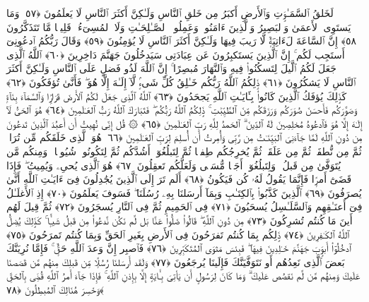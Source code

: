  لَخَلقُ ٱلسَّمَـٰوَٟتِ وَٱلأَرضِ أَكبَرُ مِن خَلقِ ٱلنَّاسِ وَلَـٰكِنَّ أَكثَرَ ٱلنَّاسِ لَا يَعلَمُونَ ﴿٥٧﴾
 وَمَا يَستَوِى ٱلأَعمَىٰ وَٱلبَصِيرُ وَٱلَّذِينَ ءَامَنُوا۟ وَعَمِلُوا۟ ٱلصَّـٰلِحَـٰتِ وَلَا ٱلمُسِىٓءُ ۚ قَلِيلًۭا مَّا تَتَذَكَّرُونَ ﴿٥٨﴾
 إِنَّ ٱلسَّاعَةَ لَءَاتِيَةٌۭ لَّا رَيبَ فِيهَا وَلَـٰكِنَّ أَكثَرَ ٱلنَّاسِ لَا يُؤمِنُونَ ﴿٥٩﴾
 وَقَالَ رَبُّكُمُ ٱدعُونِىٓ أَستَجِب لَكُم ۚ إِنَّ ٱلَّذِينَ يَستَكبِرُونَ عَن عِبَادَتِى سَيَدخُلُونَ جَهَنَّمَ دَاخِرِينَ ﴿٦٠﴾
 ٱللَّهُ ٱلَّذِى جَعَلَ لَكُمُ ٱلَّيلَ لِتَسكُنُوا۟ فِيهِ وَٱلنَّهَارَ مُبصِرًا ۚ إِنَّ ٱللَّهَ لَذُو فَضلٍ عَلَى ٱلنَّاسِ وَلَـٰكِنَّ أَكثَرَ ٱلنَّاسِ لَا يَشكُرُونَ ﴿٦١﴾
 ذَٟلِكُمُ ٱللَّهُ رَبُّكُم خَـٰلِقُ كُلِّ شَىءٍۢ لَّآ إِلَـٰهَ إِلَّا هُوَ ۖ فَأَنَّىٰ تُؤفَكُونَ ﴿٦٢﴾
 كَذَٟلِكَ يُؤفَكُ ٱلَّذِينَ كَانُوا۟ بِـَٔايَـٰتِ ٱللَّهِ يَجحَدُونَ ﴿٦٣﴾
 ٱللَّهُ ٱلَّذِى جَعَلَ لَكُمُ ٱلأَرضَ قَرَارًۭا وَٱلسَّمَآءَ بِنَآءًۭ وَصَوَّرَكُم فَأَحسَنَ صُوَرَكُم وَرَزَقَكُم مِّنَ ٱلطَّيِّبَٰتِ ۚ ذَٟلِكُمُ ٱللَّهُ رَبُّكُم ۖ فَتَبَارَكَ ٱللَّهُ رَبُّ ٱلعَـٰلَمِينَ ﴿٦٤﴾
 هُوَ ٱلحَىُّ لَآ إِلَـٰهَ إِلَّا هُوَ فَٱدعُوهُ مُخلِصِينَ لَهُ ٱلدِّينَ ۗ ٱلحَمدُ لِلَّهِ رَبِّ ٱلعَـٰلَمِينَ ﴿٦٥﴾
 ۞ قُل إِنِّى نُهِيتُ أَن أَعبُدَ ٱلَّذِينَ تَدعُونَ مِن دُونِ ٱللَّهِ لَمَّا جَآءَنِىَ ٱلبَيِّنَـٰتُ مِن رَّبِّى وَأُمِرتُ أَن أُسلِمَ لِرَبِّ ٱلعَـٰلَمِينَ ﴿٦٦﴾
 هُوَ ٱلَّذِى خَلَقَكُم مِّن تُرَابٍۢ ثُمَّ مِن نُّطفَةٍۢ ثُمَّ مِن عَلَقَةٍۢ ثُمَّ يُخرِجُكُم طِفلًۭا ثُمَّ لِتَبلُغُوٓا۟ أَشُدَّكُم ثُمَّ لِتَكُونُوا۟ شُيُوخًۭا ۚ وَمِنكُم مَّن يُتَوَفَّىٰ مِن قَبلُ ۖ وَلِتَبلُغُوٓا۟ أَجَلًۭا مُّسَمًّۭى وَلَعَلَّكُم تَعقِلُونَ ﴿٦٧﴾
 هُوَ ٱلَّذِى يُحىِۦ وَيُمِيتُ ۖ فَإِذَا قَضَىٰٓ أَمرًۭا فَإِنَّمَا يَقُولُ لَهُۥ كُن فَيَكُونُ ﴿٦٨﴾
 أَلَم تَرَ إِلَى ٱلَّذِينَ يُجَٰدِلُونَ فِىٓ ءَايَـٰتِ ٱللَّهِ أَنَّىٰ يُصرَفُونَ ﴿٦٩﴾
 ٱلَّذِينَ كَذَّبُوا۟ بِٱلكِتَـٰبِ وَبِمَآ أَرسَلنَا بِهِۦ رُسُلَنَا ۖ فَسَوفَ يَعلَمُونَ ﴿٧٠﴾
 إِذِ ٱلأَغلَـٰلُ فِىٓ أَعنَـٰقِهِم وَٱلسَّلَـٰسِلُ يُسحَبُونَ ﴿٧١﴾
 فِى ٱلحَمِيمِ ثُمَّ فِى ٱلنَّارِ يُسجَرُونَ ﴿٧٢﴾
 ثُمَّ قِيلَ لَهُم أَينَ مَا كُنتُم تُشرِكُونَ ﴿٧٣﴾
 مِن دُونِ ٱللَّهِ ۖ قَالُوا۟ ضَلُّوا۟ عَنَّا بَل لَّم نَكُن نَّدعُوا۟ مِن قَبلُ شَيـًۭٔا ۚ كَذَٟلِكَ يُضِلُّ ٱللَّهُ ٱلكَـٰفِرِينَ ﴿٧٤﴾
 ذَٟلِكُم بِمَا كُنتُم تَفرَحُونَ فِى ٱلأَرضِ بِغَيرِ ٱلحَقِّ وَبِمَا كُنتُم تَمرَحُونَ ﴿٧٥﴾
 ٱدخُلُوٓا۟ أَبوَٟبَ جَهَنَّمَ خَـٰلِدِينَ فِيهَا ۖ فَبِئسَ مَثوَى ٱلمُتَكَبِّرِينَ ﴿٧٦﴾
 فَٱصبِر إِنَّ وَعدَ ٱللَّهِ حَقٌّۭ ۚ فَإِمَّا نُرِيَنَّكَ بَعضَ ٱلَّذِى نَعِدُهُم أَو نَتَوَفَّيَنَّكَ فَإِلَينَا يُرجَعُونَ ﴿٧٧﴾
 وَلَقَد أَرسَلنَا رُسُلًۭا مِّن قَبلِكَ مِنهُم مَّن قَصَصنَا عَلَيكَ وَمِنهُم مَّن لَّم نَقصُص عَلَيكَ ۗ وَمَا كَانَ لِرَسُولٍ أَن يَأتِىَ بِـَٔايَةٍ إِلَّا بِإِذنِ ٱللَّهِ ۚ فَإِذَا جَآءَ أَمرُ ٱللَّهِ قُضِىَ بِٱلحَقِّ وَخَسِرَ هُنَالِكَ ٱلمُبطِلُونَ ﴿٧٨﴾
